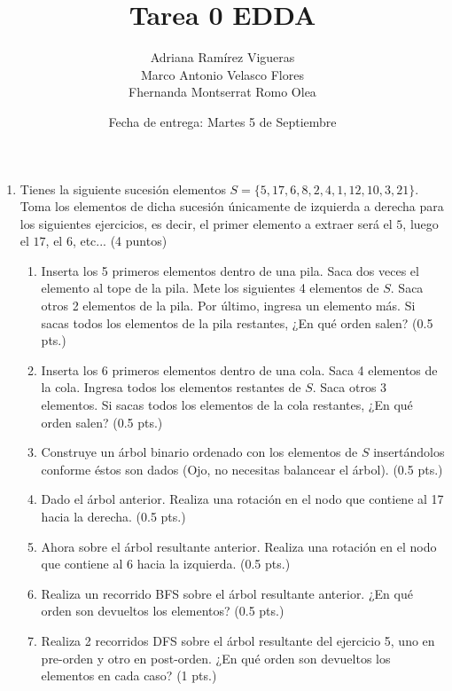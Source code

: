 \documentclass{article}
\title{Tarea 0 EDDA}
\author{Adriana Ramírez Vigueras\\ Marco Antonio Velasco Flores\\ Fhernanda Montserrat Romo Olea}
\date{Fecha de entrega: Martes 5 de Septiembre}
\begin{document}
\maketitle

\begin{enumerate}

\item Tienes la siguiente sucesión elementos $S = \{5,17,6,8,2,4,1,12,10,3,21\}$. Toma los elementos de dicha sucesión únicamente de izquierda a derecha para los siguientes ejercicios, es decir, el primer elemento a extraer será el $5$, luego el $17$, el $6$, etc... (4 puntos)

\begin{enumerate}

    \item Inserta los 5 primeros elementos dentro de una pila. Saca dos veces el elemento al tope de la pila. Mete los siguientes 4 elementos de $S$. Saca otros 2 elementos de la pila. Por último, ingresa un elemento más. Si sacas todos los elementos de la pila restantes, ¿En qué orden salen? (0.5 pts.)

    \item Inserta los 6 primeros elementos dentro de una cola. Saca 4 elementos de la cola. Ingresa todos los elementos restantes de $S$. Saca otros 3 elementos. Si sacas todos los elementos de la cola restantes, ¿En qué orden salen? (0.5 pts.)
    
    \item Construye un árbol binario ordenado con los elementos de $S$ insertándolos conforme éstos son dados (Ojo, no necesitas balancear el árbol). (0.5 pts.)

    \item Dado el árbol anterior. Realiza una rotación en el nodo que contiene al 17 hacia la derecha. (0.5 pts.)

    \item Ahora sobre el árbol resultante anterior. Realiza una rotación en el nodo que contiene al 6 hacia la izquierda. (0.5 pts.)

    \item Realiza un recorrido BFS sobre el árbol resultante anterior. ¿En qué orden son devueltos los elementos? (0.5 pts.)

    \item Realiza 2 recorridos DFS sobre el árbol resultante del ejercicio 5, uno en pre-orden y otro en post-orden. ¿En qué orden son devueltos los elementos en cada caso? (1 pts.)


\end{enumerate}
\end{enumerate}
\end{document}
